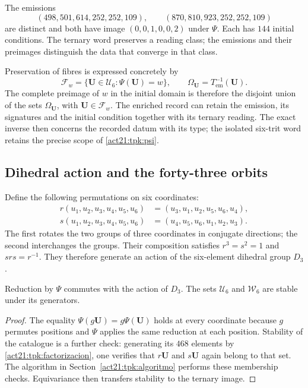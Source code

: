 \begin{example}
\label{act21:tpk:colision}
The emissions
\[
 (498,501,614,252,252,109),\qquad
 (870,810,923,252,252,109)
\]
are distinct and both have image \((0,0,1,0,0,2)\) under \(\Psi\).
Each has \(144\) initial conditions. The ternary word preserves a reading
class; the emissions and their preimages distinguish the data that
converge in that class.
\end{example}

Preservation of fibres is expressed concretely by
\[
 \mathcal F_w=\{\mathbf U\in\mathcal U_6:\Psi(\mathbf U)=w\},
 \qquad
 \Omega_{\mathbf U}=T_{\mathrm{em}}^{-1}(\mathbf U).
\]
The complete preimage of \(w\) in the initial domain is therefore the
disjoint union of the sets \(\Omega_{\mathbf U}\), with
\(\mathbf U\in\mathcal F_w\). The enriched record can retain the
emission, its signatures and the initial condition together with its
ternary reading. The exact inverse then concerns the recorded datum with
its type; the isolated six-trit word retains the precise scope of
\eqref{act21:tpk:psi}.

\subsection{Dihedral action and the forty-three orbits}
\label{act21:tpk:orbitas}

Define the following permutations on six coordinates:
\begin{align}
 r(u_1,u_2,u_3,u_4,u_5,u_6)
   &=(u_3,u_1,u_2,u_5,u_6,u_4),\\
 s(u_1,u_2,u_3,u_4,u_5,u_6)
   &=(u_4,u_5,u_6,u_1,u_2,u_3).
 \label{act21:tpk:generadores-diedrales}
\end{align}
The first rotates the two groups of three coordinates in conjugate
directions; the second interchanges the groups. Their composition
satisfies \(r^3=s^2=1\) and \(srs=r^{-1}\). They therefore generate an
action of the six-element dihedral group \(D_3\).

\begin{proposition}
\label{act21:tpk:equivarianza}
Reduction by \(\Psi\) commutes with the action of \(D_3\). The sets
\(\mathcal U_6\) and \(\mathcal W_6\) are stable under its generators.
\end{proposition}
\begin{proof}
The equality \(\Psi(g\mathbf U)=g\Psi(\mathbf U)\) holds at every
coordinate because \(g\) permutes positions and \(\Psi\) applies the
same reduction at each position. Stability of the catalogue is a further
check: generating its \(468\) elements by
\eqref{act21:tpk:factorizacion}, one verifies that \(r\mathbf U\) and
\(s\mathbf U\) again belong to that set. The algorithm in
Section~\ref{act21:tpk:algoritmo} performs these membership checks.
Equivariance then transfers stability to the ternary image.
\end{proof}

